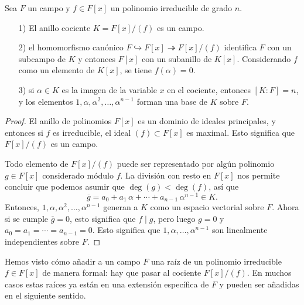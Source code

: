 \begin{teorema}
  \label{thm:cociente-por-polinomio-irreducible}
  Sea $F$ un campo y $f \in F [x]$ un polinomio irreducible de grado
  $n$.
  \begin{enumerate}
  \item[1)] El anillo cociente $K = F [x]/(f)$ es un campo.

  \item[2)] el homomorfismo canónico
    $F \hookrightarrow F [x] \twoheadrightarrow F [x]/(f)$ identifica $F$ con un
    subcampo de $K$ y entonces $F [x]$ con un subanillo de $K [x]$. Considerando
    $f$ como un elemento de $K [x]$, se tiene $f (\alpha) = 0$.

  \item[3)] si $\alpha \in K$ es la imagen de la variable $x$ en el
    cociente, entonces $[K:F] = n$, y los elementos
    $1,\alpha,\alpha^2,\ldots,\alpha^{n-1}$ forman una base de $K$ sobre $F$.
  \end{enumerate}

  \begin{proof}
    El anillo de polinomios $F [x]$ es un dominio de ideales principales,
    y entonces si $f$ es irreducible, el ideal $(f) \subset F [x]$ es maximal.
    Esto significa que $F [x]/(f)$ es un campo.

    Todo elemento de $F [x]/(f)$ puede ser representado por algún polinomio
    $g \in F [x]$ considerado módulo $f$. La división con resto en $F [x]$ nos
    permite concluir que podemos asumir que $\deg (g) < \deg (f)$, así que
    $$\overline{g} = a_0 + a_1\,\alpha + \cdots + a_{n-1}\,\alpha^{n-1} \in K.$$
    Entonces, $1,\alpha,\alpha^2,\ldots,\alpha^{n-1}$ generan a $K$ como un
    espacio vectorial sobre $F$. Ahora si se cumple $\overline{g} = 0$, esto
    significa que $f \mid g$, pero luego $g = 0$ y
    $a_0 = a_1 = \cdots = a_{n-1} = 0$. Esto significa que
    $1, \alpha, \ldots, \alpha^{n-1}$ son linealmente independientes sobre $F$.
  \end{proof}
\end{teorema}

Hemos visto cómo añadir a un campo $F$ una raíz de un polinomio irreducible
$f \in F [x]$ de manera formal: hay que pasar al cociente $F [x]/(f)$. En muchos
casos estas raíces ya están en una extensión específica de $F$ y pueden ser
añadidas en el siguiente sentido.

